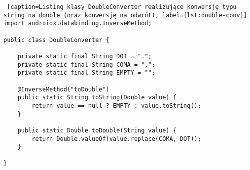 \documentclass[a4paper,12pt]{article}
\begin{document}
\begin{lstlisting} [caption=Listing klasy DoubleConverter realizujące konwersję typu string na double (oraz konwersję na odwrót), label={lst:double-conv}]
import androidx.databinding.InverseMethod;

public class DoubleConverter {

    private static final String DOT = ".";
    private static final String COMA = ",";
    private static final String EMPTY = "";

    @InverseMethod("toDouble")
    public static String toString(Double value) {
        return value == null ? EMPTY : value.toString();
    }

    public static Double toDouble(String value) {
        return Double.valueOf(value.replace(COMA, DOT));
    }

}
\end{lstlisting}
\end{document}
